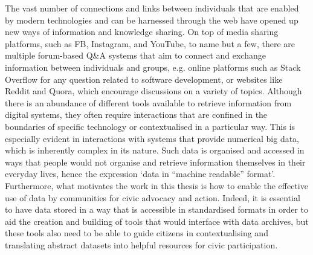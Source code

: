 The vast number of connections and links between individuals that are enabled by modern technologies and can be harnessed through the web have opened up new ways of information and knowledge sharing. On top of media sharing platforms, such as FB, Instagram, and YouTube, to name but a few, there are multiple forum-based Q\&A systems that aim to connect and exchange information between individuals and groups, e.g. online platforms such as Stack Overflow for any question related to software development, or websites like Reddit and Quora, which encourage discussions on a variety of topics. Although there is an abundance of different tools available to retrieve information from digital systems, they often require interactions that are confined in the boundaries of specific technology or contextualised in a particular way. This is especially evident in interactions with systems that provide numerical big data, which is inherently complex in its nature. Such data is organised and accessed in ways that people would not organise and retrieve information themselves in their everyday lives, hence the expression `data in ``machine readable'' format'. Furthermore, what motivates the work in this thesis is how to enable the effective use of data by communities for civic advocacy and action. Indeed, it is essential to have data stored in a way that is accessible in standardised formats in order to aid the creation and building of tools that would interface with data archives, but these tools also need to be able to guide citizens in contextualising and translating abstract datasets into helpful resources for civic participation.

